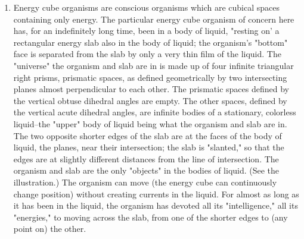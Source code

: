 \documentclass[10pt,twoside]{memoir}
\begin{document}
\begin{enumerate}
{\begin{enumerate}
\begin{sysrules}
\begin{sysrules}
\begin{sysrules}
\begin{sysrules}
{\begin{enumerate}
\begin{enumerate}
\item Energy cube organisms are conscious organisms which are cubical 
spaces containing only energy. The particular energy cube organism of 
concern here has, for an indefinitely long time, been in a body of liquid, 
"resting on' a rectangular energy slab also in the body of liquid; the 
organism's "bottom" face is separated from the slab by only a very thin film 
of the liquid. The "universe" the organism and slab are in is made up of four 
infinite triangular right prisms, prismatic spaces, as defined geometrically by 
two intersecting planes almost perpendicular to each other. The prismatic 
spaces defined by the vertical obtuse dihedral angles are empty. The other 
spaces, defined by the vertical acute dihedral angles, are infinite bodies of a 
stationary, colorless liquid--the "upper" body of liquid being what the 
organism and slab are in. The two opposite shorter edges of the slab are at 
the faces of the body of liquid, the planes, near their intersection; the slab is 
"slanted," so that the edges are at slightly different distances from the line 
of intersection. The organism and slab are the only "objects" in the bodies 
of liquid. (See the illustration.) The organism can move (the energy cube can 
continuously change position) without creating currents in the liquid. For 
almost as long as it has been in the liquid, the organism has devoted all its 
"intelligence," all its "energies," to moving across the slab, from one of the 
shorter edges to (any point on) the other. 


\end{enumerate}
\end{enumerate}}
\end{sysrules}
\end{sysrules}
\end{sysrules}
\end{sysrules}
\end{enumerate}}
\end{enumerate}
\end{document}
